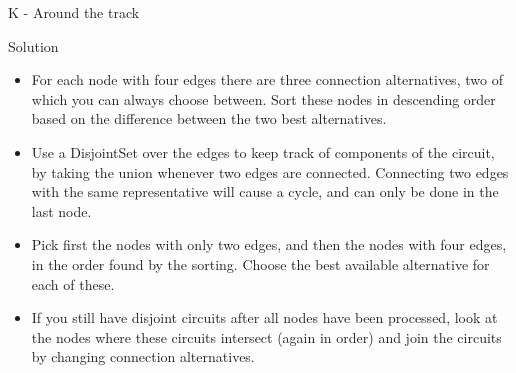 \renewcommand{\insertshortauthor}{Jon Marius Venstad}
\begin{frame}{K - Around the track}

\begin{block}{Solution}
  \begin{itemize}
	\item For each node with four edges there are three connection alternatives, two of which you can always choose between. Sort these nodes in descending order based on the difference between the two best alternatives. 
	\item Use a DisjointSet over the edges to keep track of components of the circuit, by taking the union whenever two edges are connected. Connecting two edges with the same representative will cause a cycle, and can only be done in the last node.
	\item Pick first the nodes with only two edges, and then the nodes with four edges, in the order found by the sorting. Choose the best available alternative for each of these.
	\item If you still have disjoint circuits after all nodes have been processed, look at the nodes where these circuits intersect (again in order) and join the circuits by changing connection alternatives. 
  \end{itemize}
\end{block}

\end{frame}
